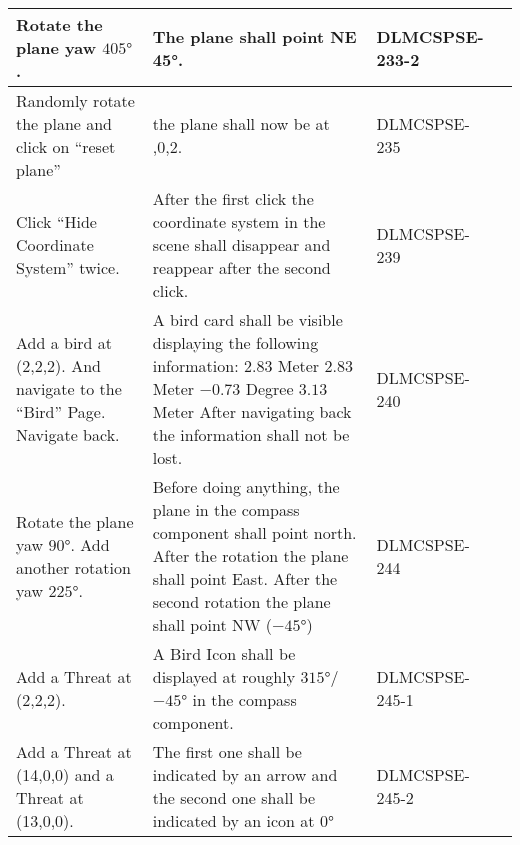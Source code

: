 \begin{xltabular}{\textwidth}{|X|X|M{3cm}|M{3cm}|}
  Rotate the plane yaw $405°$. & The plane shall point NE 45°. & {\color{purpleT}\ttfamily DLMCSPSE-233-2} &  \\ \hline 
  Randomly rotate the plane and click on \enquote{reset plane} & the plane shall now be at {,0,2}. & {\color{purpleT}\ttfamily DLMCSPSE-235} &  \\ \hline 
  Click \enquote{Hide Coordinate System} twice. & After the first click the coordinate system in the scene shall disappear and reappear after the second click. & {\color{purpleT}\ttfamily DLMCSPSE-239} &  \\ \hline 
  Add a bird at {\ttfamily (2,2,2)}. And navigate to the \enquote{Bird} Page. \newline Navigate back. & A bird card shall be visible displaying the following information: \newline $2.83$ Meter \newline $2.83$ Meter \newline $-0.73$ Degree \newline $3.13$ Meter \newline After navigating back the information shall not be lost. & {\color{purpleT}\ttfamily DLMCSPSE-240} &  \\ \hline 
  Rotate the plane yaw $90°$. \newline Add another rotation yaw $225°$. & Before doing anything, the plane in the compass component shall point north. \newline After the rotation the plane shall point East. After the second rotation the plane shall point NW ($-45°$) & {\color{purpleT}\ttfamily DLMCSPSE-244} &  \\ \hline 
  Add a Threat at (2,2,2). & A Bird Icon shall be displayed at roughly $315°$/$-45°$ in the compass component. & {\color{purpleT}\ttfamily DLMCSPSE-245-1} &  \\ \hline 
  Add a Threat at {\ttfamily (14,0,0)} and a Threat at {\ttfamily (13,0,0)}. & The first one shall be indicated by an arrow and the second one shall be indicated by an icon at $0°$ & {\color{purpleT}\ttfamily DLMCSPSE-245-2} &  \\ \hline 
  
\end{xltabular} 
 \egroup 
 \color{default}